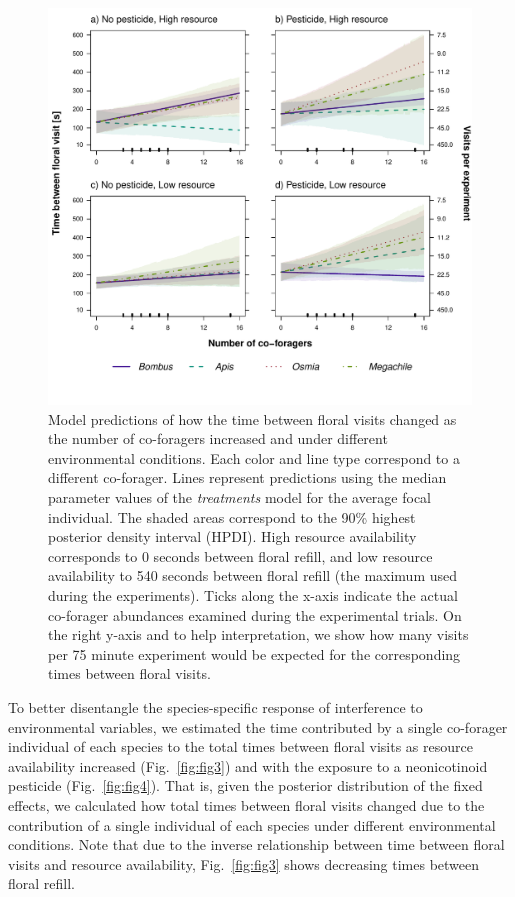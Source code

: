 \begin{refsection}
\begin{figure}[H]
    \centerline{\includegraphics[height=0.7\textheight]{figures/chapter2_fig2.pdf}}
    \caption[Model predictions of how the time between floral visits changed as the number of co-foragers increased and under different environmental conditions]{ Model predictions of how the time between floral visits changed as the number of co-foragers increased and under different environmental conditions. Each color and line type correspond to a different co-forager. Lines represent predictions using the median parameter values of the \textit{treatments} model for the average focal individual. The shaded areas correspond to the 90\% highest posterior density interval (HPDI). High resource availability corresponds to 0 seconds between floral refill, and low resource availability to 540 seconds between floral refill (the maximum used during the experiments). Ticks along the x-axis indicate the actual co-forager abundances examined during the experimental trials. On the right y-axis and to help interpretation, we show how many visits per 75 minute experiment would be expected for the corresponding times between floral visits.}
    \label{fig:fig2}
\end{figure}{}

To better disentangle the species-specific response of interference to environmental variables, we estimated the time contributed by a single co-forager individual of each species to the total times between floral visits as resource availability increased (Fig.~\ref{fig:fig3}) and with the exposure to a neonicotinoid pesticide (Fig.~\ref{fig:fig4}). That is, given the posterior distribution of the fixed effects, we calculated how total times between floral visits changed due to the contribution of a single individual of each species under different environmental conditions. Note that due to the inverse relationship between time between floral visits and resource availability, Fig.~\ref{fig:fig3} shows decreasing times between floral refill.


\end{refsection}
